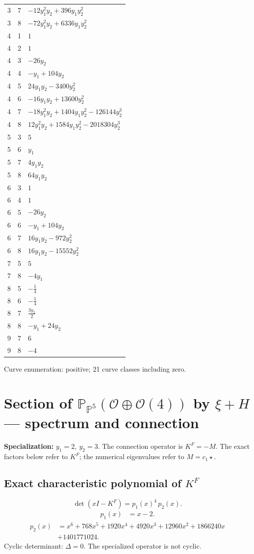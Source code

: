 \documentclass[10pt,a4paper]{article}
\begin{document}
{\begin{longtable}{rrp{125mm}}
3 & 7 & $- 12 y_{1}^{2} y_{2} + 396 y_{1} y_{2}^{2}$\\
3 & 8 & $- 72 y_{1}^{2} y_{2} + 6336 y_{1} y_{2}^{2}$\\
4 & 1 & $1$\\
4 & 2 & $1$\\
4 & 3 & $- 26 y_{2}$\\
4 & 4 & $- y_{1} + 104 y_{2}$\\
4 & 5 & $24 y_{1} y_{2} - 3400 y_{2}^{2}$\\
4 & 6 & $- 16 y_{1} y_{2} + 13600 y_{2}^{2}$\\
4 & 7 & $- 18 y_{1}^{2} y_{2} + 1404 y_{1} y_{2}^{2} - 126144 y_{2}^{3}$\\
4 & 8 & $12 y_{1}^{2} y_{2} + 1584 y_{1} y_{2}^{2} - 2018304 y_{2}^{3}$\\
5 & 3 & $5$\\
5 & 6 & $y_{1}$\\
5 & 7 & $4 y_{1} y_{2}$\\
5 & 8 & $64 y_{1} y_{2}$\\
6 & 3 & $1$\\
6 & 4 & $1$\\
6 & 5 & $- 26 y_{2}$\\
6 & 6 & $- y_{1} + 104 y_{2}$\\
6 & 7 & $16 y_{1} y_{2} - 972 y_{2}^{2}$\\
6 & 8 & $16 y_{1} y_{2} - 15552 y_{2}^{2}$\\
7 & 5 & $5$\\
7 & 8 & $- 4 y_{1}$\\
8 & 5 & $- \frac{1}{4}$\\
8 & 6 & $- \frac{1}{4}$\\
8 & 7 & $\frac{3 y_{2}}{2}$\\
8 & 8 & $- y_{1} + 24 y_{2}$\\
9 & 7 & $6$\\
9 & 8 & $-4$\\
\end{longtable}}
Curve enumeration: positive; 21 curve classes including zero.
\clearpage\section*{Section of $\mathbb P_{\mathbb P^{5}}(\mathcal O\oplus \mathcal O(4))$ by $\xi +H$ --- spectrum and connection}
\textbf{Specialization:} $y_1=2,\ y_2=3$. The connection operator is $K^F=-M$. The exact factors below refer to $K^F$; the numerical eigenvalues refer to $M=c_1\star$.
\subsection*{Exact characteristic polynomial of $K^F$}
\[\det(xI-K^F)=p_{1}(x)^{4}\,p_{2}(x).\]
\[\begin{aligned}p_{1}(x)&=x - 2.\end{aligned}\]
\[\begin{aligned}p_{2}(x)&=x^{6} + 768 x^{5} + 1920 x^{4} + 4920 x^{3} + 12960 x^{2} + 1866240 x\\&+1401771024.\end{aligned}\]
Cyclic determinant: $\Delta=0$. The specialized operator is not cyclic.
\end{document}
